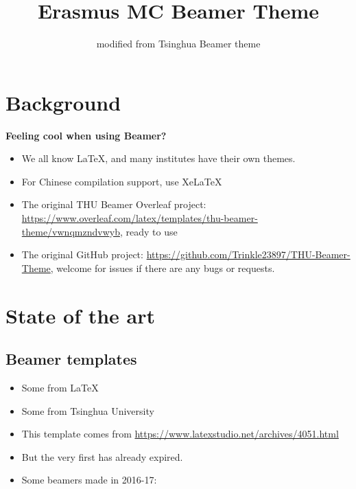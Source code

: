 \documentclass{beamer}
\title{\textbf{Erasmus MC Beamer Theme}}
\subtitle{modified from Tsinghua Beamer theme}
\renewcommand{\cite}{\parencite}
\begin{document}


\section{Background}

\begin{frame}{\textbf{Feeling cool when using Beamer?}}
    \begin{itemize}[<+-| alert@+>] %
        \item We all know \LaTeX{}, and many institutes have their own themes.
        \item For Chinese compilation support, use Xe\LaTeX{}
        \item The original THU Beamer Overleaf project: \url{https://www.overleaf.com/latex/templates/thu-beamer-theme/vwnqmzndvwyb}, ready to use
        \item The original GitHub project:  \url{https://github.com/Trinkle23897/THU-Beamer-Theme}, welcome for issues if there are any bugs or requests.
    \end{itemize}
\end{frame}


\section{State of the art}

\subsection{Beamer templates}

\begin{frame}
    \begin{itemize}
        \item Some from \LaTeX{}
        \item Some from Tsinghua University
        \item This template comes from \newline \url{https://www.latexstudio.net/archives/4051.html}
        \item But the very first \href{http://far.tooold.cn/post/latex/beamertsinghua}{\color{purple}{link}} \cite{origin} has already expired.
        \item Some beamers made in 2016-17: \href{https://github.com/Trinkle23897/oi_slides}{\color{erasmusmc!50!white}{click me}}
    \end{itemize}
\end{frame}
\end{document}
